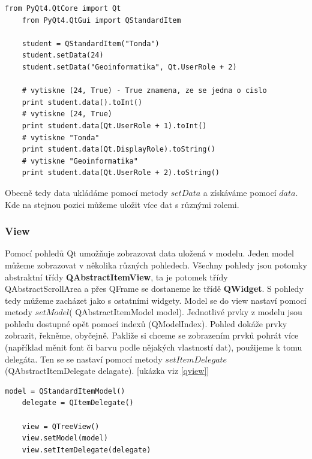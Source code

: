 \begin{lstlisting}[label=qstandarditem,caption={QStandardItem - vytvoření a získání dat}, morekeywords={PyQt4, QtCore, QtGui, QStandardItem, Qt, Qt.UserRole, Qt.DisplayRole}]
	from PyQt4.QtCore import Qt
	from PyQt4.QtGui import QStandardItem

	student = QStandardItem("Tonda")
	student.setData(24)
	student.setData("Geoinformatika", Qt.UserRole + 2)

	# vytiskne (24, True) - True znamena, ze se jedna o cislo
	print student.data().toInt() 					
	# vytiskne (24, True)
	print student.data(Qt.UserRole + 1).toInt()		
	# vytiskne "Tonda"
	print student.data(Qt.DisplayRole).toString() 	
	# vytiskne "Geoinformatika"
	print student.data(Qt.UserRole + 2).toString() 	

\end{lstlisting}

Obecně tedy data ukládáme pomocí metody $setData$ a získáváme pomocí $data$. Kde na stejnou pozici můžeme uložit více dat s různými rolemi.
 
\subsubsection*{View}

Pomocí pohledů Qt umožňuje zobrazovat data uložená v modelu. Jeden model můžeme zobrazovat v několika různých pohledech. Všechny pohledy jsou potomky abstraktní třídy \textbf{QAbstractItemView}, ta je potomek třídy QAbstractScrollArea a přes QFrame se dostaneme ke třídě \textbf{QWidget}. S pohledy tedy můžeme zacházet jako s ostatními widgety. Model se do view nastaví pomocí metody $setModel$( QAbstractItemModel model). Jednotlivé prvky z modelu jsou pohledu dostupné opět pomocí indexů (QModelIndex). Pohled dokáže prvky zobrazit, řekněme, obyčejně. Pakliže si chceme se zobrazením prvků pohrát více (například měnit font či barvu podle nějakých vlastností dat), použijeme k tomu delegáta. Ten se se nastaví pomocí metody $setItemDelegate$(QAbstractItemDelegate delagate). [ukázka viz \ref{qview}] \\

\begin{lstlisting}[label=qview,caption={View - vytvoření pohledu a nastavení modelu a delegáta}, morekeywords={QItemDelegate, QStandardItemModel, QTreeView}]
	model = QStandardItemModel()
	delegate = QItemDelegate()

	view = QTreeView()
	view.setModel(model)
	view.setItemDelegate(delegate)
\end{lstlisting}

